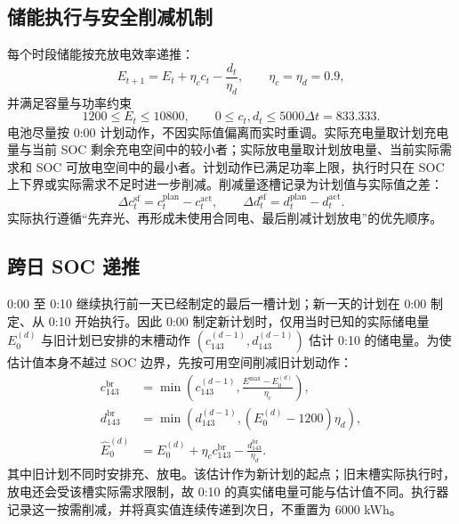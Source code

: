 \documentclass[withoutpreface,bwprint]{cumcmthesis}
\begin{document}
\subsection{储能执行与安全削减机制}

每个时段储能按充放电效率递推：
\begin{equation}
E_{t+1}=E_t+\eta_c c_t-\frac{d_t}{\eta_d},\qquad \eta_c=\eta_d=0.9,
\label{eq:q2_soc}
\end{equation}
并满足容量与功率约束
\begin{equation}
1200\le E_t\le 10800,\qquad 0\le c_t,d_t\le 5000\Delta t=833.333.
\label{eq:q2_bounds}
\end{equation}
电池尽量按 0:00 计划动作，不因实际值偏离而实时重调。实际充电量取计划充电量与当前 SOC 剩余充电空间中的较小者；实际放电量取计划放电量、当前实际需求和 SOC 可放电空间中的最小者。计划动作已满足功率上限，执行时只在 SOC 上下界或实际需求不足时进一步削减。削减量逐槽记录为计划值与实际值之差：
\begin{equation}
\Delta c_t^{\mathrm{sf}}=c_t^{\mathrm{plan}}-c_t^{\mathrm{act}},\qquad
\Delta d_t^{\mathrm{sf}}=d_t^{\mathrm{plan}}-d_t^{\mathrm{act}}.
\label{eq:q2_shortfall}
\end{equation}
实际执行遵循“先弃光、再形成未使用合同电、最后削减计划放电”的优先顺序。

\subsection{跨日 SOC 递推}

0:00 至 0:10 继续执行前一天已经制定的最后一槽计划；新一天的计划在 0:00 制定、从 0:10 开始执行。因此 0:00 制定新计划时，仅用当时已知的实际储电量 $E_0^{(d)}$ 与旧计划已安排的末槽动作 $(c_{143}^{(d-1)},d_{143}^{(d-1)})$ 估计 0:10 的储电量。为使估计值本身不越过 SOC 边界，先按可用空间削减旧计划动作：
\begin{equation}
\begin{aligned}
c_{143}^{\mathrm{br}}&=\min\!\left(c_{143}^{(d-1)},\frac{E^{\max}-E_0^{(d)}}{\eta_c}\right),\\
d_{143}^{\mathrm{br}}&=\min\!\left(d_{143}^{(d-1)},(E_0^{(d)}-1200)\eta_d\right),\\
\hat E_0^{(d)}&=E_0^{(d)}+\eta_c c_{143}^{\mathrm{br}}-\frac{d_{143}^{\mathrm{br}}}{\eta_d}.
\end{aligned}
\label{eq:q2_bridge}
\end{equation}
其中旧计划不同时安排充、放电。该估计作为新计划的起点；旧末槽实际执行时，放电还会受该槽实际需求限制，故 0:10 的真实储电量可能与估计值不同。执行器记录这一按需削减，并将真实值连续传递到次日，不重置为 6000 kWh。
\end{document}
